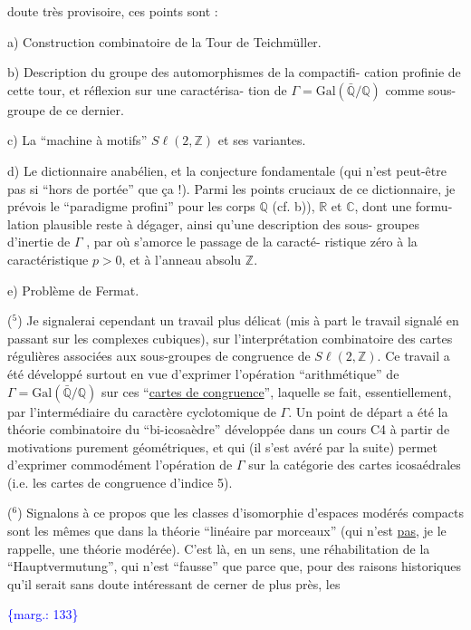 \documentclass[11pt]{article}
\newcommand{\scanpage}[1]{\par\bigskip\noindent{\small\sffamily[scan #1]}\par}
\newcommand{\mspage}[1]{{\small\sffamily[p.\,#1]}}
\newcommand{\margin}[1]{\textcolor{blue}{\{\textsf{marg.:} #1\}}}
\newcommand{\uline}[1]{\underline{#1}}
\begin{document}
doute très provisoire, ces points sont :

a) Construction combinatoire de la Tour de Teichmüller.

b) Description du groupe des automorphismes de la compactifi-%
cation profinie de cette tour, et réflexion sur une caractérisa-%
tion de $\Gamma = \mathrm{Gal}(\bar{\mathbb{Q}}/\mathbb{Q})$ comme sous-groupe de ce dernier.

c) La ``machine à motifs'' $S\ell(2,\mathbb{Z})$ et ses variantes.

d) Le dictionnaire anabélien, et la conjecture fondamentale
(qui n'est peut-être pas si ``hors de portée'' que ça !). Parmi
les points cruciaux de ce dictionnaire, je prévois le ``paradigme
profini'' pour les corps $\mathbb{Q}$ (cf. b)), $\mathbb{R}$ et $\mathbb{C}$, dont une formu-%
lation plausible reste à dégager, ainsi qu'une description des sous-%
groupes d'inertie de $\Gamma$ , par où s'amorce le passage de la caracté-%
ristique zéro à la caractéristique $p > 0$, et à l'anneau absolu $\mathbb{Z}$.

e) Problème de Fermat.

($^5$) Je signalerai cependant un travail plus délicat (mis à part
le travail signalé en passant sur les complexes cubiques), sur
l'interprétation combinatoire des cartes régulières associées aux
sous-groupes de congruence de $S\ell(2,\mathbb{Z})$. Ce travail a été développé
surtout en vue d'exprimer l'opération ``arithmétique'' de $\Gamma = \mathrm{Gal}(\bar{\mathbb{Q}}/\mathbb{Q})$
sur ces ``\uline{cartes de congruence}'', laquelle se fait, essentiellement,
par l'intermédiaire du caractère cyclotomique de $\Gamma$. Un point de
départ a été la théorie combinatoire du ``bi-icosaèdre'' développée
dans un cours C4 à partir de motivations purement géométriques,
et qui (il s'est avéré par la suite) permet d'exprimer commodément
l'opération de $\Gamma$ sur la catégorie des cartes icosaédrales (i.e.
les cartes de congruence d'indice 5).

($^6$) Signalons à ce propos que les classes d'isomorphie d'espaces
modérés compacts sont les mêmes que dans la théorie ``linéaire par
morceaux'' (qui n'est \uline{pas}, je le rappelle, une théorie modérée).
C'est là, en un sens, une réhabilitation de la ``Hauptvermutung'',
qui n'est ``fausse'' que parce que, pour des raisons historiques
qu'il serait sans doute intéressant de cerner de plus près, les

\margin{133}

\clearpage
\scanpage{119/134}
\mspage{56}
\end{document}
